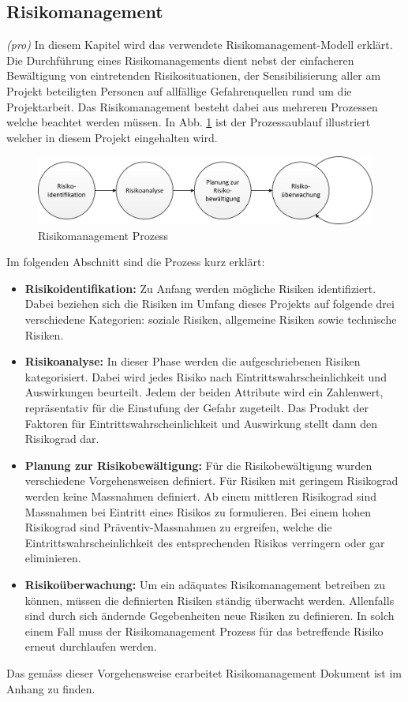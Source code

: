 \subsection{Risikomanagement}
\textit{(pro)} In diesem Kapitel wird das verwendete Risikomanagement-Modell erklärt. Die Durchführung eines Risikomanagements dient nebst der einfacheren Bewältigung von eintretenden Risikosituationen, der Sensibilisierung aller am Projekt beteiligten Personen auf allfällige Gefahrenquellen rund um die Projektarbeit. Das Risikomanagement besteht dabei aus mehreren Prozessen welche beachtet werden müssen. In Abb. \ref{fig:Risikomanagement} ist der Prozessaublauf illustriert welcher in diesem Projekt eingehalten wird.

\begin{figure}[H]
	\includegraphics[draft=false,width=1\textwidth]{Illustrationen/2-Methodik/Risikomanagement.png}
	\caption{Risikomanagement Prozess}
	\label{fig:Risikomanagement}
\end{figure}
\newpage
Im folgenden Abschnitt sind die Prozess kurz erklärt:

\begin{itemize}
	\item \textbf{Risikoidentifikation:} Zu Anfang werden mögliche Risiken identifiziert. Dabei beziehen sich die Risiken im Umfang dieses Projekts auf folgende drei verschiedene Kategorien: soziale Risiken, allgemeine Risiken sowie technische Risiken.
	\item \textbf{Risikoanalyse:} In dieser Phase werden die aufgeschriebenen Risiken kategorisiert. Dabei wird jedes Risiko nach Eintrittswahrscheinlichkeit und Auswirkungen beurteilt. Jedem der beiden Attribute wird ein Zahlenwert, repräsentativ für die Einstufung der Gefahr zugeteilt. Das Produkt der Faktoren für Eintrittswahrscheinlichkeit und Auswirkung stellt dann den Risikograd dar.
	\item \textbf{Planung zur Risikobewältigung:} Für die Risikobewältigung wurden verschiedene Vorgehensweisen definiert. Für Risiken mit geringem Risikograd werden keine Massnahmen definiert. Ab einem mittleren Risikograd sind Massnahmen bei Eintritt eines Risikos zu formulieren. Bei einem hohen Risikograd sind Präventiv-Massnahmen zu ergreifen, welche die Eintrittswahrscheinlichkeit des entsprechenden Risikos verringern oder gar eliminieren.
	\item \textbf{Risikoüberwachung:} Um ein adäquates Risikomanagement betreiben zu können, müssen die definierten Risiken ständig überwacht werden. Allenfalls sind durch sich ändernde Gegebenheiten neue Risiken zu definieren. In solch einem Fall muss der Risikomanagement Prozess für das betreffende Risiko erneut durchlaufen werden.
\end{itemize}

Das gemäss dieser Vorgehensweise erarbeitet Risikomanagement Dokument ist im Anhang zu finden.